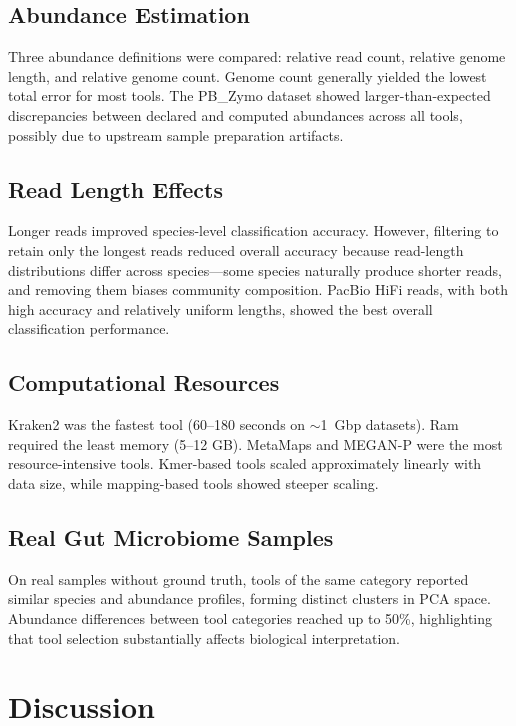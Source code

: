 \documentclass[11pt]{article}
\begin{document}
\subsection{Abundance Estimation}

Three abundance definitions were compared: relative read count, relative genome length, and relative genome count. Genome count generally yielded the lowest total error for most tools. The PB\_Zymo dataset showed larger-than-expected discrepancies between declared and computed abundances across all tools, possibly due to upstream sample preparation artifacts.

\subsection{Read Length Effects}

Longer reads improved species-level classification accuracy. However, filtering to retain only the longest reads reduced overall accuracy because read-length distributions differ across species---some species naturally produce shorter reads, and removing them biases community composition. PacBio HiFi reads, with both high accuracy and relatively uniform lengths, showed the best overall classification performance.

\subsection{Computational Resources}

Kraken2 was the fastest tool (60--180 seconds on $\sim$1~Gbp datasets). Ram required the least memory (5--12 GB). MetaMaps and MEGAN-P were the most resource-intensive tools. Kmer-based tools scaled approximately linearly with data size, while mapping-based tools showed steeper scaling.

\subsection{Real Gut Microbiome Samples}

On real samples without ground truth, tools of the same category reported similar species and abundance profiles, forming distinct clusters in PCA space. Abundance differences between tool categories reached up to 50\%, highlighting that tool selection substantially affects biological interpretation.

\section{Discussion}
\end{document}
